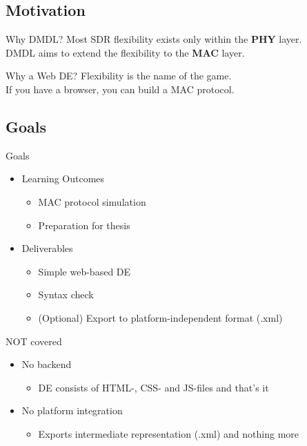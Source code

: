 \documentclass{beamer}
\begin{document}
\subsection{Motivation}

\begin{frame}{Why DMDL?}
	Most SDR flexibility exists only within the \textbf{PHY} layer.\\
	DMDL aims to extend the flexibility to the \textbf{MAC} layer.
\end{frame}

\begin{frame}{Why a Web DE?}
	Flexibility is the name of the game. \\
	If you have a browser, you can build a MAC protocol.
\end{frame}

\subsection{Goals}

\begin{frame}{Goals}
	\begin{itemize}
		\item<2-> Learning Outcomes
		\begin{itemize}
			\item<3-> MAC protocol simulation
			\item<4-> Preparation for thesis
		\end{itemize}

		\item<5-> Deliverables
		\begin{itemize}
			\item<6-> Simple web-based DE
			\item<7-> Syntax check
			\item<8-> (Optional) Export to platform-independent format (.xml) 
		\end{itemize}
	\end{itemize}
\end{frame}

\begin{frame}{NOT covered}
	\begin{itemize}
		\item<2-> No backend
		\begin{itemize}
			\item<3-> DE consists of HTML-, CSS- and JS-files and that's it
		\end{itemize}
		\item<4-> No platform integration
		\begin{itemize}
			\item<5-> Exports intermediate representation (.xml) and nothing more
		\end{itemize}
	\end{itemize}
\end{frame}
\end{document}
